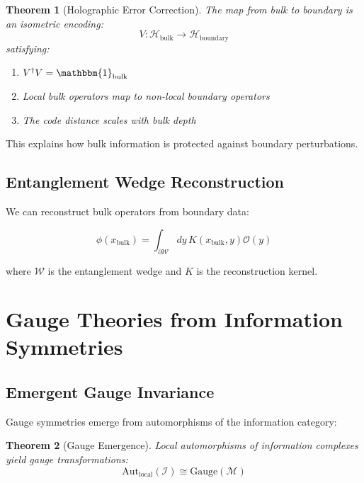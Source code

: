 \documentclass[12pt]{article}
\newtheorem{theorem}{Theorem}[section]
\begin{document}
\begin{theorem}[Holographic Error Correction]
The map from bulk to boundary is an isometric encoding:
\begin{equation}
V: \mathcal{H}_{\text{bulk}} \to \mathcal{H}_{\text{boundary}}
\end{equation}
satisfying:
\begin{enumerate}
\item $V^\dagger V = \mathbbm{1}_{\text{bulk}}$
\item Local bulk operators map to non-local boundary operators
\item The code distance scales with bulk depth
\end{enumerate}
\end{theorem}

This explains how bulk information is protected against boundary perturbations.

\subsection{Entanglement Wedge Reconstruction}

We can reconstruct bulk operators from boundary data:

\begin{equation}
\phi(x_{\text{bulk}}) = \int_{\partial \mathcal{W}} dy \, K(x_{\text{bulk}}, y) \mathcal{O}(y)
\end{equation}

where $\mathcal{W}$ is the entanglement wedge and $K$ is the reconstruction kernel.

\section{Gauge Theories from Information Symmetries}

\subsection{Emergent Gauge Invariance}

Gauge symmetries emerge from automorphisms of the information category:

\begin{theorem}[Gauge Emergence]
Local automorphisms of information complexes yield gauge transformations:
\begin{equation}
\text{Aut}_{\text{local}}(\mathcal{I}) \cong \text{Gauge}(\mathcal{M})
\end{equation}
\end{theorem}
\end{document}
